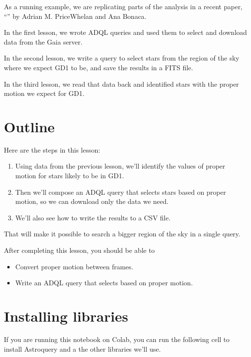 \documentclass[letterpaper,10pt,english]{sphinxmanual}
\begin{document}
As a running example, we are replicating parts of the analysis in a recent paper, “” by Adrian M. Price\sphinxhyphen{}Whelan and Ana Bonaca.

In the first lesson, we wrote ADQL queries and used them to select and download data from the Gaia server.

In the second lesson, we write a query to select stars from the region of the sky where we expect GD\sphinxhyphen{}1 to be, and save the results in a FITS file.

In the third lesson, we read that data back and identified stars with the proper motion we expect for GD\sphinxhyphen{}1.


\section{Outline}
\label{\detokenize{04_select:outline}}
Here are the steps in this lesson:
\begin{enumerate}
%
\item {} 
Using data from the previous lesson, we’ll identify the values of proper motion for stars likely to be in GD\sphinxhyphen{}1.

\item {} 
Then we’ll compose an ADQL query that selects stars based on proper motion, so we can download only the data we need.

\item {} 
We’ll also see how to write the results to a CSV file.

\end{enumerate}

That will make it possible to search a bigger region of the sky in a single query.

After completing this lesson, you should be able to
\begin{itemize}
\item {} 
Convert proper motion between frames.

\item {} 
Write an ADQL query that selects based on proper motion.

\end{itemize}


\section{Installing libraries}
\label{\detokenize{04_select:installing-libraries}}
If you are running this notebook on Colab, you can run the following cell to install Astroquery and a the other libraries we’ll use.
\end{document}

